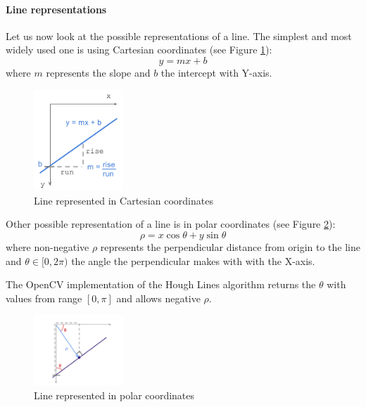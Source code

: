 \paragraph{Line representations}
Let us now look at the possible representations of a line. The simplest and most widely used one is using Cartesian coordinates (see Figure \ref{fig:line_cartesian}):
\begin{equation}
	y = m x + b
\end{equation}
where $m$ represents the slope and $b$ the intercept with Y-axis.
\begin{figure}[H]
	\centering
	\includegraphics[width=0.3\textwidth]{images/hough_cartesian_equation}
	\caption{Line represented in Cartesian coordinates}
	\label{fig:line_cartesian}
\end{figure}
Other possible representation of a line is in polar coordinates (see Figure \ref{fig:line_polar}):
\begin{equation}
	\rho = x \cos\theta + y \sin\theta
\end{equation}
where non-negative $\rho$ represents the perpendicular distance from origin to the line and $\theta \in [0, 2\pi)$ the angle the perpendicular makes with with the X-axis.
\begin{note}
	The OpenCV implementation of the Hough Lines algorithm returns the $\theta$ with values from range $[0, \pi]$ and allows negative $\rho$.
\end{note}
\begin{figure}[H]
	\centering
	\includegraphics[width=0.3\textwidth]{images/hough_polar}
	\caption{Line represented in polar coordinates}
	\label{fig:line_polar}
\end{figure}

